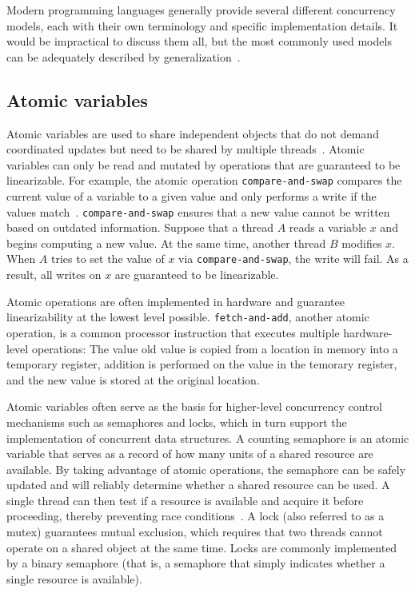 \documentclass{sig-alternate}
\newcommand{\code}[1]{\texttt{#1}}
\begin{document}
Modern programming languages generally provide several different concurrency models, each with their own terminology and specific implementation details. It would be impractical to discuss them all, but the most commonly used models can be adequately described by generalization~\cite{Swalens2014}.

\subsection{Atomic variables}

Atomic variables are used to share independent objects that do not demand coordinated updates but need to be shared by multiple threads~\cite{Swalens2014}. Atomic variables can only be read and mutated by operations that are guaranteed to be linearizable. For example, the atomic operation \code{compare-and-swap} compares the current value of a variable to a given value and only performs a write if the values match~\cite{Swalens2014}. \code{compare-and-swap} ensures that a new value cannot be written based on outdated information. Suppose that a thread $A$ reads a variable $x$ and begins computing a new value. At the same time, another thread $B$ modifies $x$. When $A$ tries to set the value of $x$ via \code{compare-and-swap}, the write will fail. As a result, all writes on $x$ are guaranteed to be linearizable.

Atomic operations are often implemented in hardware and guarantee linearizability at the lowest level possible. \code{fetch-and-add}, another atomic operation, is a common processor instruction that executes multiple hardware-level operations: The value old value is copied from a location in memory into a temporary register, addition is performed on the value in the temorary register, and the new value is stored at the original location.

Atomic variables often serve as the basis for higher-level concurrency control mechanisms such as semaphores and locks, which in turn support the implementation of concurrent data structures. A counting semaphore is an atomic variable that serves as a record of how many units of a shared resource are available. By taking advantage of atomic operations, the semaphore can be safely updated and will reliably determine whether a shared resource can be used. A single thread can then test if a resource is available and acquire it before proceeding, thereby preventing race conditions~\cite{Swalens2014}. A lock (also referred to as a mutex) guarantees mutual exclusion, which requires that two threads cannot operate on a shared object at the same time. Locks are commonly implemented by a binary semaphore (that is, a semaphore that simply indicates whether a single resource is available).
\end{document}
